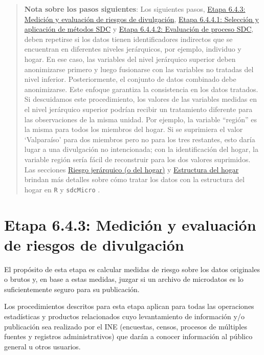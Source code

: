 \documentclass[
]{book}
\theoremstyle{definition}
\theoremstyle{definition}
\theoremstyle{definition}
\theoremstyle{definition}
\theoremstyle{remark}
\begin{document}
\begin{quote}
\textbf{Nota sobre los pasos siguientes}:
Los siguientes pasos, \protect\hyperlink{etapa-6.4.3-mediciuxf3n-y-evaluaciuxf3n-de-riesgos-de-divulgaciuxf3n}{Etapa 6.4.3: Medición y evaluación de riesgos de divulgación}, \protect\hyperlink{etapa-6.4.4.1-selecciuxf3n-y-aplicaciuxf3n-de-muxe9todos-sdc}{Etapa 6.4.4.1: Selección y aplicación de métodos SDC} y \protect\hyperlink{etapa-6.4.4.2-evaluaciuxf3n-de-proceso-sdc}{Etapa 6.4.4.2: Evaluación de proceso SDC}, deben repetirse si los datos tienen identificadores indirectos que se encuentran en diferentes niveles jerárquicos, por ejemplo, individuo y hogar. En ese caso, las variables del nivel jerárquico superior deben anonimizarse primero y luego fusionarse con las variables no tratadas del nivel inferior. Posteriormente, el conjunto de datos combinado debe anonimizarse. Este enfoque garantiza la consistencia en los datos tratados. Si descuidamos este procedimiento, los valores de las variables medidas en el nivel jerárquico superior podrían recibir un tratamiento diferente para las observaciones de la misma unidad. Por ejemplo, la variable ``región'' es la misma para todos los miembros del hogar. Si se suprimiera el valor `Valparaíso' para dos miembros pero no para los tres restantes, esto daría lugar a una divulgación no intencionada; con la identificación del hogar, la variable región sería fácil de reconstruir para los dos valores suprimidos. Las secciones \protect\hyperlink{riesgo-jeruxe1rquico-o-del-hogar}{Riesgo jerárquico (o del hogar)} y \protect\hyperlink{estructura-del-hogar}{Estructura del hogar} brindan más detalles sobre cómo tratar los datos con la estructura del hogar en \texttt{R} y \texttt{sdcMicro} .
\end{quote}

\hypertarget{etapa-6.4.3-mediciuxf3n-y-evaluaciuxf3n-de-riesgos-de-divulgaciuxf3n}{%
\section{Etapa 6.4.3: Medición y evaluación de riesgos de divulgación}\label{etapa-6.4.3-mediciuxf3n-y-evaluaciuxf3n-de-riesgos-de-divulgaciuxf3n}}

El propósito de esta etapa es calcular medidas de riesgo sobre los datos originales o brutos y, en base a estas medidas, juzgar si un archivo de microdatos es lo suficientemente seguro para su publicación.

Los procedimientos descritos para esta etapa aplican para todas las operaciones estadísticas y productos relacionados cuyo levantamiento de información y/o publicación sea realizado por el INE (encuestas, censos, procesos de múltiples fuentes y registros administrativos) que darán a conocer información al público general u otros usuarios.
\end{document}
